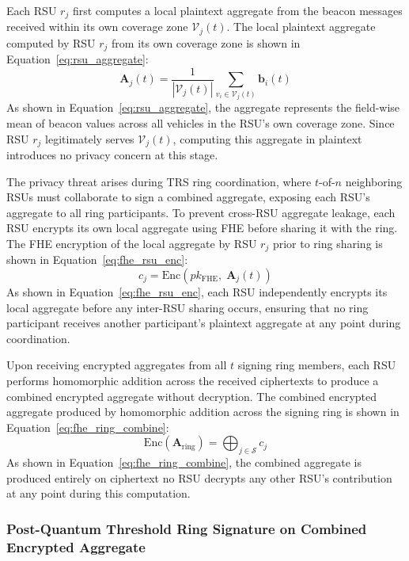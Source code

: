 \documentclass[12pt, a4paper]{report}
\begin{document}
Each RSU $r_j$ first computes a local plaintext aggregate from the beacon
messages received within its own coverage zone $\mathcal{V}_j(t)$. The local
plaintext aggregate computed by RSU $r_j$ from its own coverage zone is shown
in Equation~\eqref{eq:rsu_aggregate}:
\begin{equation}
  \mathbf{A}_j(t) = \frac{1}{|\mathcal{V}_j(t)|}
    \sum_{v_i \in \mathcal{V}_j(t)} \mathbf{b}_i(t)
  \label{eq:rsu_aggregate}
\end{equation}
As shown in Equation~\eqref{eq:rsu_aggregate}, the aggregate represents the
field-wise mean of beacon values across all vehicles in the RSU's own coverage
zone. Since RSU $r_j$ legitimately serves $\mathcal{V}_j(t)$, computing this
aggregate in plaintext introduces no privacy concern at this stage.

The privacy threat arises during TRS ring coordination, where $t$-of-$n$
neighboring RSUs must collaborate to sign a combined aggregate, exposing each
RSU's aggregate to all ring participants. To prevent cross-RSU aggregate
leakage, each RSU encrypts its own local aggregate using FHE before sharing
it with the ring. The FHE encryption of the local aggregate by RSU $r_j$ prior
to ring sharing is shown in Equation~\eqref{eq:fhe_rsu_enc}:
\begin{equation}
  c_j = \mathrm{Enc}(pk_{\mathrm{FHE}},\; \mathbf{A}_j(t))
  \label{eq:fhe_rsu_enc}
\end{equation}
As shown in Equation~\eqref{eq:fhe_rsu_enc}, each RSU independently encrypts
its local aggregate before any inter-RSU sharing occurs, ensuring that no ring
participant receives another participant's plaintext aggregate at any point
during coordination.

Upon receiving encrypted aggregates from all $t$ signing ring members, each
RSU performs homomorphic addition across the received ciphertexts to produce
a combined encrypted aggregate without decryption. The combined encrypted
aggregate produced by homomorphic addition across the signing ring is shown
in Equation~\eqref{eq:fhe_ring_combine}:
\begin{equation}
  \mathrm{Enc}(\mathbf{A}_{\mathrm{ring}}) =
    \bigoplus_{j \in \mathcal{S}} c_j
  \label{eq:fhe_ring_combine}
\end{equation}
As shown in Equation~\eqref{eq:fhe_ring_combine}, the combined aggregate is
produced entirely on ciphertext no RSU decrypts any other RSU's contribution
at any point during this computation.

\subsubsection{Post-Quantum Threshold Ring Signature on Combined Encrypted Aggregate}
\end{document}
